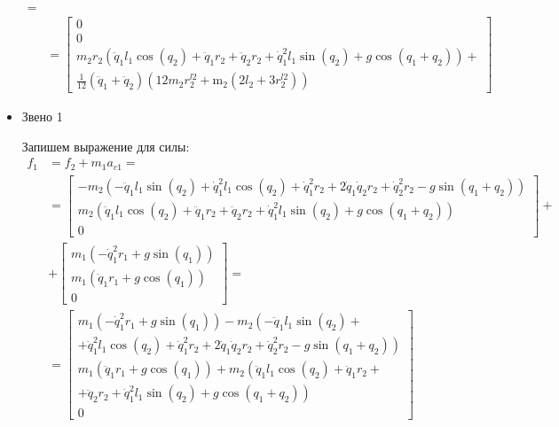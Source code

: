 \documentclass[a4paper,14pt]{extreport}
\begin{document}
\begin{itemize}
\begin{align*}
=\\
&= 
\left[\begin{matrix}0\\0\\
m_{2} r_{2} \left(\ddot{q}_1 l_{1} \cos{\left (q_{2} \right )} + \ddot{q}_1 r_{2} + \ddot{q}_2 r_{2} + \dot{q}_1^{2} l_{1} \sin{\left (q_{2} \right )} + g \cos{\left (q_{1} + q_{2} \right )}\right) +\\ \frac{1}{12} \left(\ddot{q}_1 + \ddot{q}_2\right) \left(12 m_{2} r^{l2}_{2} + \operatorname{m_{2}}{\left (2 l_{2} + 3 r^{l2}_{2} \right )}\right)\end{matrix}\right]
\end{align*}

\item Звено 1

Запишем выражение для силы:
\begin{align*}
f_1 &= f_2 + m_1 a_{c1} =\\
&=
\left[
\begin{matrix}- m_{2} \left(- \ddot{q}_1 l_{1} \sin{\left (q_{2} \right )} + \dot{q}_1^{2} l_{1} \cos{\left (q_{2} \right )} + \dot{q}_1^{2} r_{2} + 2 \dot{q}_1 \dot{q}_2 r_{2} + \dot{q}_2^{2} r_{2} - g \sin{\left (q_{1} + q_{2} \right )}\right)\\
m_{2} \left(\ddot{q}_1 l_{1} \cos{\left (q_{2} \right )} + \ddot{q}_1 r_{2} + \ddot{q}_2 r_{2} + \dot{q}_1^{2} l_{1} \sin{\left (q_{2} \right )} + g \cos{\left (q_{1} + q_{2} \right )}\right)\\
0
\end{matrix}\right]
+\\
&+
\left[\begin{matrix}m_{1} \left(- \dot{q}_1^{2} r_{1} + g \sin{\left (q_{1} \right )}\right)\\
m_{1} \left(\ddot{q}_1 r_{1} + g \cos{\left (q_{1} \right )}\right)\\
0\end{matrix}\right]
=\\
&=
\left[\begin{matrix}
m_{1} \left(- \dot{q}_1^{2} r_{1} + g \sin{\left (q_{1} \right )}\right) - m_{2} \left(- \ddot{q}_1 l_{1} \sin{\left (q_{2} \right )} \right.+\\+\left. \dot{q}_1^{2} l_{1} \cos{\left (q_{2} \right )} + \dot{q}_1^{2} r_{2} + 2 \dot{q}_1 \dot{q}_2 r_{2} + \dot{q}_2^{2} r_{2} - g \sin{\left (q_{1} + q_{2} \right )}\right)\\
m_{1} \left(\ddot{q}_1 r_{1} + g \cos{\left (q_{1} \right )}\right) + m_{2} \left(\ddot{q}_1 l_{1} \cos{\left (q_{2} \right )} + \ddot{q}_1 r_{2} \right.+\\+\left. \ddot{q}_2 r_{2} + \dot{q}_1^{2} l_{1} \sin{\left (q_{2} \right )} + g \cos{\left (q_{1} + q_{2} \right )}\right)\\0\end{matrix}\right]

\end{align*}
\end{itemize}
\end{document}
